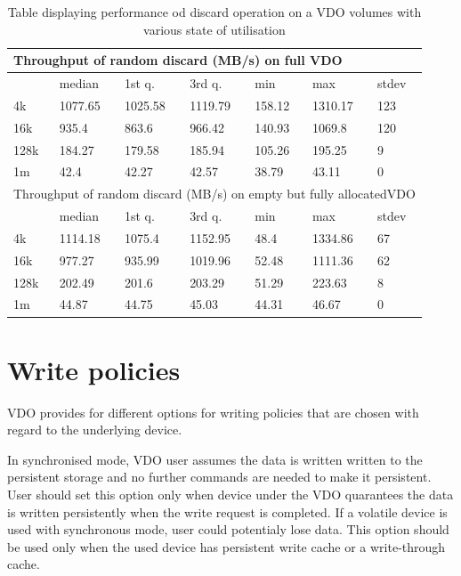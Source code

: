 \documentclass[
  color, %
  table, %
  lof,   %
  lot,   %
]{fithesis3}
\begin{document}
\begin{table}
\centering
\begin{tabular}{|l|l|l|l|l|l|l|}
        \hline
        \multicolumn{7}{|l|}{Throughput of random discard (MB/s) on full VDO} \\ \hline
         & median & 1st q. & 3rd q. & min & max & stdev \\ \hline 
4k & 1077.65 & 1025.58 & 1119.79 & 158.12 & 1310.17 & 123 \\ \hline
16k & 935.4 & 863.6 & 966.42 & 140.93 & 1069.8 & 120 \\ \hline
128k & 184.27 & 179.58 & 185.94 & 105.26 & 195.25 & 9 \\ \hline
1m & 42.4 & 42.27 & 42.57 & 38.79 & 43.11 & 0 \\ \hline
\hline
        \multicolumn{7}{|l|}{Throughput of random discard (MB/s) on empty but fully allocatedVDO} \\ \hline
        & median & 1st q. & 3rd q. & min & max & stdev \\ \hline 
4k & 1114.18 & 1075.4 & 1152.95 & 48.4 & 1334.86 & 67 \\ \hline
16k & 977.27 & 935.99 & 1019.96 & 52.48 & 1111.36 & 62 \\ \hline
128k & 202.49 & 201.6 & 203.29 & 51.29 & 223.63 & 8 \\ \hline
1m & 44.87 & 44.75 & 45.03 & 44.31 & 46.67 & 0 \\ \hline
\end{tabular}
\caption{Table displaying performance od discard operation on a VDO volumes with various state of utilisation}
\end{table}

\clearpage

\section{Write policies}
VDO provides for different options for writing policies that are chosen with regard to the underlying device. 

In synchronised mode, VDO user assumes the data is written written to the persistent storage and no further commands are needed to make it persistent. User should set this option only when device under the VDO quarantees the data is written persistently when the write request is completed. If a volatile device is used with synchronous mode, user could potentialy lose data. This option should be used only when the used device has persistent write cache or a write-through cache.
\end{document}
